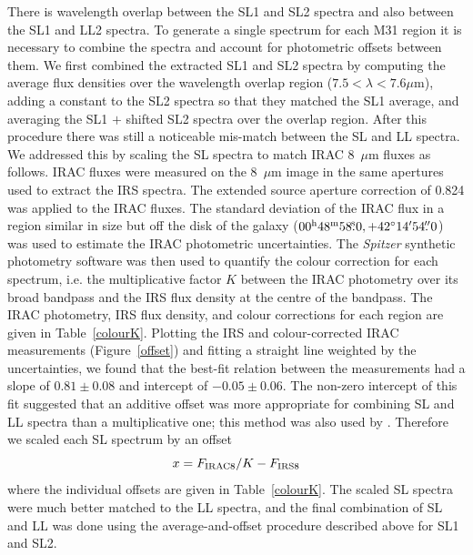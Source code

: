\documentclass[useAMS,usenatbib,a4paper]{mn2e}
\begin{document}
There is wavelength overlap between the SL1 and SL2 spectra and also between the SL1 and LL2 spectra.
To generate a single spectrum for each M31 region it is necessary to combine the spectra and
account for photometric offsets between them. We first combined the extracted SL1 and SL2 
spectra by computing the average flux densities over the wavelength overlap region ($7.5 < \lambda< 7.6\mu$m),
adding a constant  to the SL2 spectra so that they matched the SL1 average,
and averaging the SL1 $+$ shifted SL2 spectra over the overlap region.
After this procedure there was still a noticeable mis-match between the SL and LL spectra. We addressed this
by scaling the SL spectra to match IRAC 8~$\mu$m fluxes as follows. IRAC fluxes were measured
on the 8~$\mu$m image \citep{Barmby2006lr} in the same apertures used to extract the IRS spectra.
The extended source  aperture correction of 0.824 was applied to the IRAC fluxes.
The standard deviation of the IRAC flux in a region similar in size but off the disk of the galaxy 
($00^{\rmn{h}}48^{\rmn{m}}58\fs0, +42\degr14\arcmin54\farcs0$) was used to estimate the
IRAC photometric uncertainties.
The {\em Spitzer} synthetic photometry software \citep{SpitzerDAC} 
was then used to quantify the colour correction for each spectrum, i.e. the
multiplicative factor $K$ between the IRAC photometry over its broad bandpass and the IRS flux
density at the centre of the bandpass. The IRAC photometry, IRS flux density, and colour corrections 
for each region are given in Table~\ref{colourK}. Plotting the IRS  and colour-corrected IRAC measurements
(Figure~\ref{offset}) and fitting a straight line weighted by the uncertainties, we found that the best-fit relation 
between the measurements had a slope of $0.81\pm0.08$  and intercept of $-0.05\pm0.06$. 
The non-zero intercept of this fit suggested that an additive offset was more appropriate for combining SL and LL
spectra than a multiplicative one; this method was also used by \citet{Sandstrom12}.
Therefore we scaled each SL spectrum by an offset 
\begin{equation}
x = F_{\rm IRAC8}/K -   F_{\rm IRS8}
\label{eq:offset}
\end{equation}
where the individual offsets are given in Table~\ref{colourK}.
The scaled SL spectra were much better matched to the LL spectra, and the final combination
of SL and LL was done using the average-and-offset procedure described above for SL1 and SL2.
\end{document}
